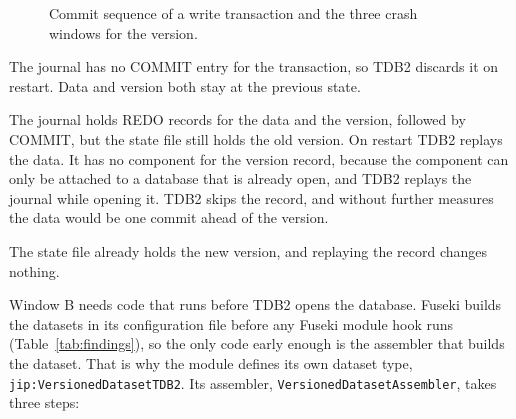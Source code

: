 \documentclass[11pt,a4paper]{article}
\newcommand{\code}[1]{\texttt{#1}}
\begin{document}
\begin{figure}[ht]
\centering
{}
\caption{Commit sequence of a write transaction and the three crash windows for the version.}
\label{fig:crash}
\end{figure}

\begin{description}[font=\normalfont\itshape, leftmargin=1.5em, style=nextline]
\item[Crash in window A.] The journal has no COMMIT entry for the transaction, so TDB2
  discards it on restart. Data and version both stay at the previous state.
\item[Crash in window B.] The journal holds REDO records for the data and the version,
  followed by COMMIT, but the state file still holds the old version. On restart TDB2
  replays the data. It has no component for the version record, because the component can
  only be attached to a database that is already open, and TDB2 replays the journal while
  opening it. TDB2 skips the record, and without further measures the data would be one
  commit ahead of the version.
\item[Crash in window C.] The state file already holds the new version, and replaying the
  record changes nothing.
\end{description}

Window B needs code that runs before TDB2 opens the database. Fuseki builds the datasets in
its configuration file before any Fuseki module hook runs (Table~\ref{tab:findings}), so the
only code early enough is the assembler that builds the dataset. That is why the module
defines its own dataset type, \code{jip:VersionedDatasetTDB2}. Its assembler,
\code{VersionedDatasetAssembler}, takes three steps:
\end{document}
